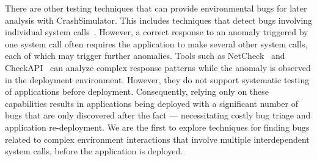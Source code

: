There
are other testing techniques that can provide environmental bugs for later
analysis with CrashSimulator.  This includes
techniques that detect bugs involving individual system
calls~\cite{Koopman00theexception,Dadeau:2008:CSM:1433121.1433137,Farchi02}.
However, a correct response to an anomaly triggered by one system call
often requires the application to make several other system calls,
each of which may trigger further anomalies. Tools such as
NetCheck~\cite{Zhuang_NSDI_2014} and
CheckAPI~\cite{rasley2015detecting} can analyze complex response
patterns while the anomaly is observed in the deployment
environment. However, they do not support systematic testing of
applications before deployment.  Consequently, relying only on these
capabilities results in applications being deployed with a significant
number of bugs that are only discovered after the fact ---
necessitating costly bug triage and application re-deployment.
We are the first to
explore techniques for finding bugs related to complex
environment interactions that involve multiple interdependent system
calls, before the application is deployed. 





